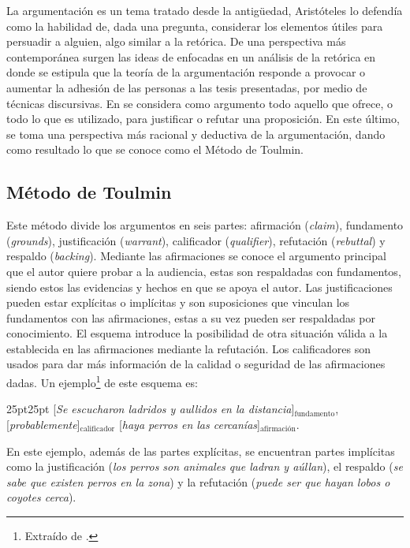 \documentclass[a4paper,11pt,twocolumn,twoside]{article}
\begin{document}
La argumentación es un tema tratado desde la antigüedad, Aristóteles lo defendía como la 
habilidad de, dada una pregunta, considerar los elementos útiles para persuadir a alguien, algo
similar a la retórica. De una perspectiva más contemporánea surgen las ideas de 
\textcite{perelman1969rhetoric}
enfocadas en un análisis de la retórica en donde se estipula que la teoría de la argumentación
responde a provocar o aumentar la adhesión de las personas a las tesis presentadas, por medio de 
técnicas discursivas. En 
\textcite{toulmin_2003}
se considera como argumento todo aquello que ofrece, 
o todo lo que es utilizado, para justificar o refutar una proposición. En este último, se toma 
una perspectiva más racional y deductiva de la argumentación, dando como resultado lo que se 
conoce como el Método de Toulmin. 

\subsection{Método de Toulmin}

Este método divide los argumentos en seis partes: afirmación 
(\textit{claim}), fundamento (\textit{grounds}), justificación (\textit{warrant}), calificador 
(\textit{qualifier}), refutación (\textit{rebuttal}) y respaldo (\textit{backing}).
Mediante las afirmaciones se conoce el argumento principal que el autor quiere probar a la audiencia,
estas son respaldadas con fundamentos, siendo estos las evidencias y hechos en que se apoya el autor.
Las justificaciones pueden estar explícitas o implícitas y son suposiciones que vinculan los
fundamentos con las afirmaciones, estas a su vez pueden ser respaldadas por conocimiento.
El esquema introduce la posibilidad de otra situación válida a la establecida en las afirmaciones
mediante la refutación. Los calificadores son usados para dar más información de la calidad o seguridad
de las afirmaciones dadas. Un ejemplo\footnote{Extraído de  
\textcite{toulminArgument}.
} de este esquema es:

\begin{adjustwidth}{25pt}{25pt}
    [\textit{Se escucharon ladridos y aullidos en la distancia}]$_{\mathrm{fundamento}}$, 
    [\textit{probablemente}]$_{\mathrm{calificador}}$ 
    [\textit{haya perros en las cercanías}]$_{\mathrm{afirmación}}$.
\end{adjustwidth}

En este ejemplo, además de las partes explícitas, se encuentran partes implícitas como la justificación 
(\textit{los perros son animales que ladran y aúllan}), el respaldo (\textit{se sabe que existen perros en la zona}) y 
la refutación (\textit{puede ser que hayan lobos o coyotes cerca}).
\end{document}
